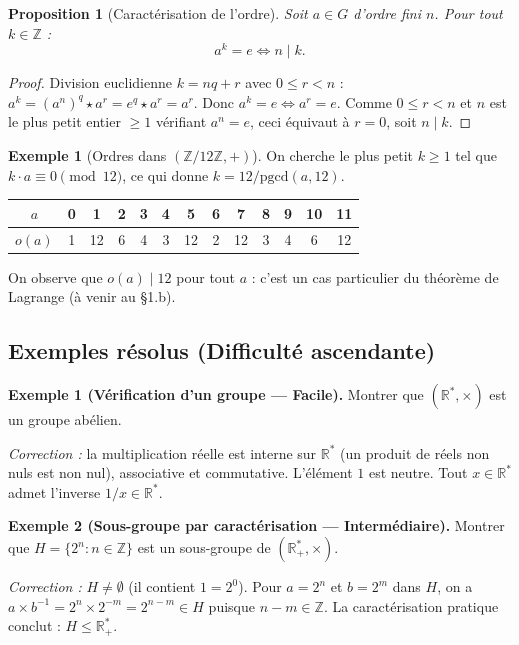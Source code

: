 \documentclass[12pt,a4paper]{report}
\newtheorem{proposition}[theoreme]{Proposition}
\theoremstyle{definition}
\newtheorem{exemple}{Exemple}[section]
\theoremstyle{remark}
\begin{document}
\begin{proposition}[Caractérisation de l'ordre]
Soit $a \in G$ d'ordre fini $n$. Pour tout $k \in \mathbb{Z}$ :
\[ a^k = e \iff n \mid k. \]
\end{proposition}

\begin{proof}
Division euclidienne $k = nq + r$ avec $0 \le r < n$ : $a^k = (a^n)^q \star a^r = e^q \star a^r = a^r$. Donc $a^k = e \iff a^r = e$. Comme $0 \le r < n$ et $n$ est le plus petit entier $\ge 1$ vérifiant $a^n = e$, ceci équivaut à $r = 0$, soit $n \mid k$.
\end{proof}

\begin{exemple}[Ordres dans $(\mathbb{Z}/12\mathbb{Z}, +)$]
On cherche le plus petit $k \ge 1$ tel que $k \cdot a \equiv 0 \pmod{12}$, ce qui donne $k = 12 / \mathrm{pgcd}(a, 12)$.
\begin{center}
\begin{tabular}{c|cccccccccccc}
$a$ & 0 & 1 & 2 & 3 & 4 & 5 & 6 & 7 & 8 & 9 & 10 & 11 \\
\hline
$o(a)$ & 1 & 12 & 6 & 4 & 3 & 12 & 2 & 12 & 3 & 4 & 6 & 12 \\
\end{tabular}
\end{center}
On observe que $o(a) \mid 12$ pour tout $a$ : c'est un cas particulier du théorème de Lagrange (à venir au §1.b).
\end{exemple}

\subsection{Exemples résolus (Difficulté ascendante)}

\textbf{Exemple 1 (Vérification d'un groupe --- Facile).}
Montrer que $(\mathbb{R}^* , \times)$ est un groupe abélien.

\textit{Correction :} la multiplication réelle est interne sur $\mathbb{R}^*$ (un produit de réels non nuls est non nul), associative et commutative. L'élément $1$ est neutre. Tout $x \in \mathbb{R}^*$ admet l'inverse $1/x \in \mathbb{R}^*$.

\medskip

\textbf{Exemple 2 (Sous-groupe par caractérisation --- Intermédiaire).}
Montrer que $H = \{2^n : n \in \mathbb{Z}\}$ est un sous-groupe de $(\mathbb{R}^*_+, \times)$.

\textit{Correction :} $H \neq \emptyset$ (il contient $1 = 2^0$). Pour $a = 2^n$ et $b = 2^m$ dans $H$, on a $a \times b^{-1} = 2^n \times 2^{-m} = 2^{n-m} \in H$ puisque $n - m \in \mathbb{Z}$. La caractérisation pratique conclut : $H \le \mathbb{R}^*_+$.
\end{document}
